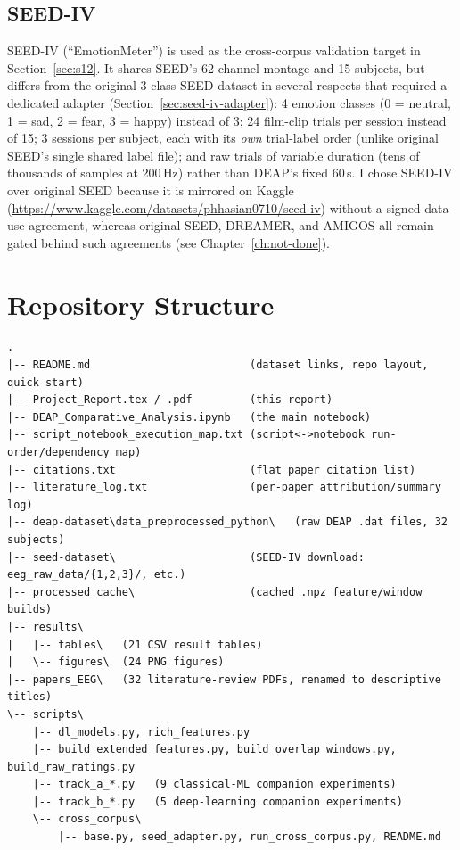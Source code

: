 \documentclass[11pt]{report}
\begin{document}
\section{SEED-IV}
SEED-IV \citep{zheng2018emotionmeter} (``EmotionMeter'') is used as the
cross-corpus validation target in Section~\ref{sec:s12}. It shares SEED's
62-channel montage and 15 subjects, but differs from the original 3-class
SEED dataset in several respects that required a dedicated adapter
(Section~\ref{sec:seed-iv-adapter}): 4 emotion classes (0 = neutral,
1 = sad, 2 = fear, 3 = happy) instead of 3; 24 film-clip trials per session
instead of 15; 3 sessions per subject, each with its \emph{own} trial-label
order (unlike original SEED's single shared label file); and raw trials of
variable duration (tens of thousands of samples at 200\,Hz) rather than
DEAP's fixed 60\,s. I chose SEED-IV over original SEED
because it is mirrored on Kaggle
(\url{https://www.kaggle.com/datasets/phhasian0710/seed-iv}) without a
signed data-use agreement, whereas original SEED, DREAMER, and AMIGOS all
remain gated behind such agreements (see Chapter~\ref{ch:not-done}).

\chapter{Repository Structure}
\label{ch:repo}

\begin{verbatim}
.
|-- README.md                         (dataset links, repo layout, quick start)
|-- Project_Report.tex / .pdf         (this report)
|-- DEAP_Comparative_Analysis.ipynb   (the main notebook)
|-- script_notebook_execution_map.txt (script<->notebook run-order/dependency map)
|-- citations.txt                     (flat paper citation list)
|-- literature_log.txt                (per-paper attribution/summary log)
|-- deap-dataset\data_preprocessed_python\   (raw DEAP .dat files, 32 subjects)
|-- seed-dataset\                     (SEED-IV download: eeg_raw_data/{1,2,3}/, etc.)
|-- processed_cache\                  (cached .npz feature/window builds)
|-- results\
|   |-- tables\   (21 CSV result tables)
|   \-- figures\  (24 PNG figures)
|-- papers_EEG\   (32 literature-review PDFs, renamed to descriptive titles)
\-- scripts\
    |-- dl_models.py, rich_features.py
    |-- build_extended_features.py, build_overlap_windows.py, build_raw_ratings.py
    |-- track_a_*.py   (9 classical-ML companion experiments)
    |-- track_b_*.py   (5 deep-learning companion experiments)
    \-- cross_corpus\
        |-- base.py, seed_adapter.py, run_cross_corpus.py, README.md
\end{verbatim}
\end{document}
